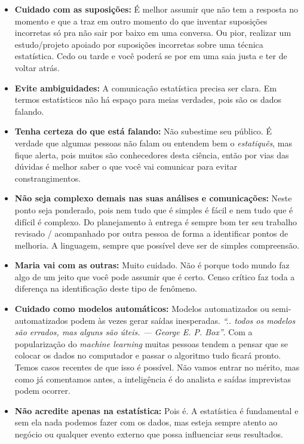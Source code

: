 \documentclass[12pt,]{style/krantz}
\theoremstyle{definition}
\theoremstyle{definition}
\theoremstyle{definition}
\theoremstyle{remark}
\begin{document}
\begin{itemize}
\item
  \textbf{Cuidado com as suposições:} É melhor assumir que não tem a
  resposta no momento e que a traz em outro momento do que inventar
  suposições incorretas só pra não sair por baixo em uma conversa. Ou
  pior, realizar um estudo/projeto apoiado por suposições incorretas
  sobre uma técnica estatística. Cedo ou tarde e você poderá se por em
  uma saia justa e ter de voltar atrás.
\item
  \textbf{Evite ambiguidades:} A comunicação estatística precisa ser
  clara. Em termos estatísticos não há espaço para meias verdades, pois
  são os dados falando.
\item
  \textbf{Tenha certeza do que está falando:} Não subestime seu público.
  É verdade que algumas pessoas não falam ou entendem bem o
  \emph{estatiquês}, mas fique alerta, pois muitos são conhecedores
  desta ciência, então por vias das dúvidas é melhor saber o que você
  vai comunicar para evitar constrangimentos.
\item
  \textbf{Não seja complexo demais nas suas análises e comunicações:}
  Neste ponto seja ponderado, pois nem tudo que é simples é fácil e nem
  tudo que é difícil é complexo. Do planejamento à entrega é sempre bom
  ter seu trabalho revisado / acompanhado por outra pessoa de forma a
  identificar pontos de melhoria. A linguagem, sempre que possível deve
  ser de simples compreensão.
\item
  \textbf{Maria vai com as outras:} Muito cuidado. Não é porque todo
  mundo faz algo de um jeito que você pode assumir que é certo. Censo
  crítico faz toda a diferença na identificação deste tipo de fenômeno.
\item
  \textbf{Cuidado como modelos automáticos:} Modelos automatizados ou
  semi-automatizados podem às vezes gerar saídas inesperadas. \emph{``..
  todos os modelos são errados, mas alguns são úteis. --- George E. P.
  Box''}. Com a popularização do \emph{machine learning} muitas pessoas
  tendem a pensar que se colocar os dados no computador e passar o
  algoritmo tudo ficará pronto. Temos casos recentes de que isso é
  possível. Não vamos entrar no mérito, mas como já comentamos antes, a
  inteligência é do analista e saídas imprevistas podem ocorrer.
\item
  \textbf{Não acredite apenas na estatística:} Pois é. A estatística é
  fundamental e sem ela nada podemos fazer com os dados, mas esteja
  sempre atento ao negócio ou qualquer evento externo que possa
  influenciar seus resultados.
\end{itemize}
\end{document}
